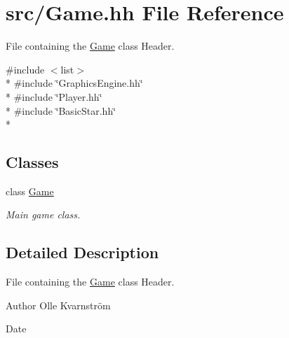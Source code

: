 \hypertarget{Game_8hh}{\section{src/\-Game.hh File Reference}
\label{Game_8hh}
}


File containing the \hyperlink{classGame}{Game} class Header.  


{\ttfamily \#include $<$list$>$}\\*
{\ttfamily \#include \char`\"{}Graphics\-Engine.\-hh\char`\"{}}\\*
{\ttfamily \#include \char`\"{}Player.\-hh\char`\"{}}\\*
{\ttfamily \#include \char`\"{}Basic\-Star.\-hh\char`\"{}}\\*
\subsection*{Classes}
\begin{DoxyCompactItemize}
\item 
class \hyperlink{classGame}{Game}
\begin{DoxyCompactList}\small\item\em Main game class. \end{DoxyCompactList}\end{DoxyCompactItemize}


\subsection{Detailed Description}
File containing the \hyperlink{classGame}{Game} class Header. \begin{DoxyAuthor}{Author}
Olle Kvarnström 
\end{DoxyAuthor}
\begin{DoxyDate}{Date}

\end{DoxyDate}
